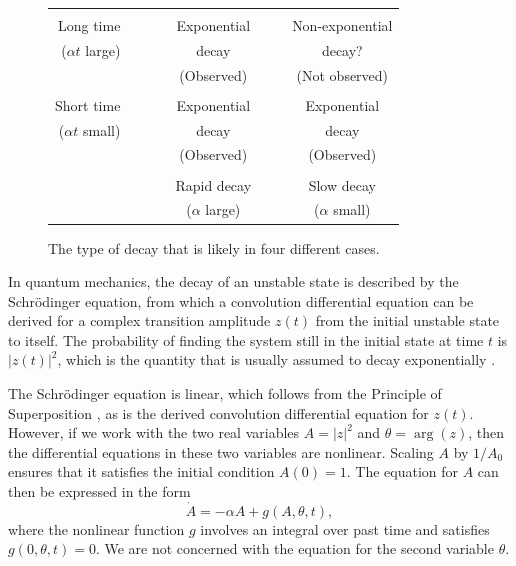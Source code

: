 \documentclass[12pt]{article}
\begin{document}
\begin{figure}[t]
\begin{center}
\begin{tabular}{r|c|c|}
\cline{2-3}
&&\\[-3mm]
Long time~~ & ~~~~Exponential~~~~ & Non-exponential \\
($\alpha t$ large)~~ & decay & decay? \\
& (Observed) & (Not observed)\\[1mm]
\cline{2-3}
&&\\[-3mm]
Short time~~ & Exponential & Exponential \\
($\alpha t$ small)~~ & decay & decay \\
& (Observed) & (Observed) \\[1mm]
\cline{2-3}
\multicolumn{1}{c}{\vspace{-3mm}} &
\multicolumn{1}{c}{} &
\multicolumn{1}{c}{}\\
\multicolumn{1}{c}{} &
\multicolumn{1}{c}{Rapid decay} &
\multicolumn{1}{c}{Slow decay}\\
\multicolumn{1}{c}{} &
\multicolumn{1}{c}{($\alpha$ large)} &
\multicolumn{1}{c}{($\alpha$ small)}\\
\end{tabular}
\end{center}
\vspace{-5mm}
\caption{The type of decay that is likely in four different cases.}
\label{table1}
\end{figure}

In quantum mechanics, the decay of an unstable state is described by the
Schr\"odinger equation, from which a convolution differential equation can be
derived for a complex transition amplitude $z(t)$ from the initial unstable
state to itself. The probability of finding the system still in the 
initial state at time $t$ is $|z(t)|^2$, which is the quantity that 
is usually assumed to decay exponentially \cite{merzbacher98,peres80}.

The Schr\"odinger equation is linear, which follows from the
Principle of Superposition \cite{merzbacher98}, as is the derived convolution 
differential equation for $z(t)$. However, if we work
with the two real variables $A=|z|^2$ and $\theta=\arg(z)$, then the
differential equations in these two variables are nonlinear. 
Scaling $A$ by $1/A_0$ ensures that it 
satisfies the initial condition $A(0)=1$.
The equation for $A$ can then be expressed in the form
\begin{equation}\label{general-eqn}
\dot A=-\alpha A+g(A,\theta,t),
\end{equation}
where the nonlinear function $g$ involves an integral over past time and
satisfies $g(0,\theta,t)=0$. We are not concerned with the equation for 
the second variable $\theta$. 
\end{document}
